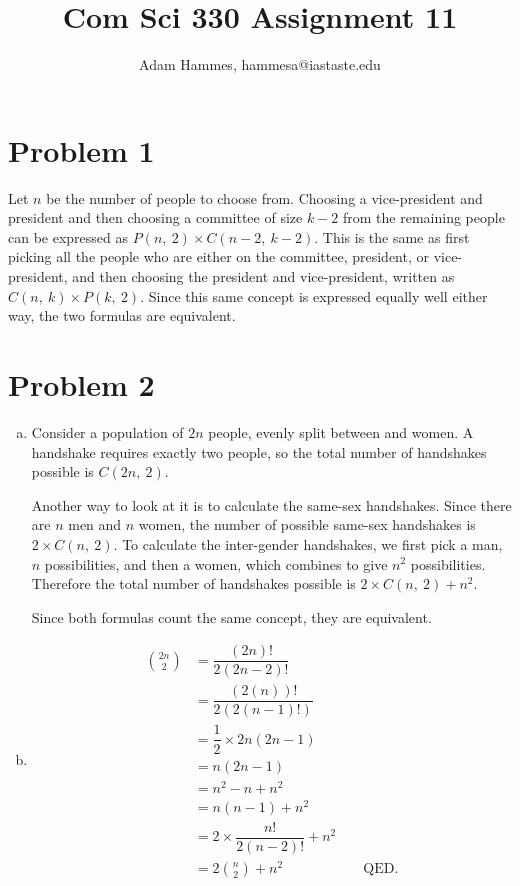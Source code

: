 \documentclass[11pt]{article}
\begin{document}
\let\iff\leftrightarrow

\title{Com Sci 330 Assignment 11}
\author{Adam Hammes, hammesa@iastaste.edu}
\maketitle

\section*{Problem 1}
	Let $n$ be the number of people to choose from. Choosing a vice-president and president and then choosing a committee of size $k-2$ from the 
	remaining people can be expressed as $P(n,\ 2)\times C(n-2,\ k-2)$. This is the same as first picking all the people who are either on the 
	committee, president, or vice-president, and then choosing the president and vice-president, written as $C(n,\ k)\times P(k,\ 2)$. Since this 
	same concept is expressed equally well either way, the two formulas are equivalent.


\section*{Problem 2}
	\begin{enumerate}[(a)]
	\item
		Consider a population of $2n$ people, evenly split between and women. A handshake requires exactly two people, so the total number of handshakes possible is $C(2n,\ 2)$.
		
		Another way to look at it is to calculate the same-sex handshakes. Since there are $n$ men and $n$ women, the number of possible same-sex handshakes is $2 \times C(n,\ 2)$. To calculate the inter-gender handshakes, we first pick a man, $n$ possibilities, and then a women, which combines to give $n^2$ possibilities. Therefore the total number of handshakes possible is $2\times C(n,\ 2) + n^2$.
		
		Since both formulas count the same concept, they are equivalent.
	\item
		\begin{align*}
		\binom{2n}{2} &= \dfrac{(2n)!}{2(2n-2)!}\\
		&= \dfrac{(2(n))!}{2(2(n-1)!)}\\
		&= \dfrac{1}{2} \times 2n(2n-1)\\
		&= n(2n-1)\\
		&= n^2 -n + n^2\\
		&= n(n-1) + n^2\\
		&= 2\times \dfrac{n!}{2(n-2)!} + n^2\\
		&= 2\binom{n}{2} + n^2 && \text{ QED.}
		\end{align*}

	\end{enumerate}
\end{document}
